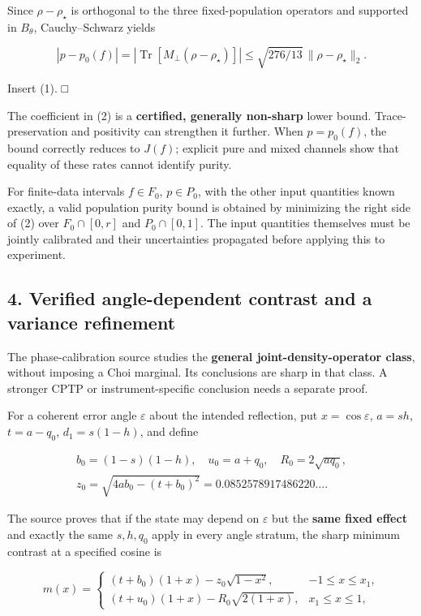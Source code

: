 \documentclass[
  10pt,
  a4paper,
]{article}
\begin{document}
Since \(\rho-\rho_\star\) is orthogonal to the three fixed-population operators and supported in \(B_\theta\), Cauchy--Schwarz yields

\[
 |p-p_0(f)|=|\operatorname{Tr}[M_\perp(\rho-\rho_\star)]|
 \le\sqrt{276/13}\,\|\rho-\rho_\star\|_2.
\]

Insert (1). □

The coefficient in (2) is a \textbf{certified, generally non-sharp} lower bound. Trace-preservation and positivity can strengthen it further. When \(p=p_0(f)\), the bound correctly reduces to \(J(f)\); explicit pure and mixed channels show that equality of these rates cannot identify purity.

For finite-data intervals \(f\in F_0\), \(p\in P_0\), with the other input quantities known exactly, a valid population purity bound is obtained by minimizing the right side of (2) over \(F_0\cap[0,r]\) and \(P_0\cap[0,1]\). The input quantities themselves must be jointly calibrated and their uncertainties propagated before applying this to experiment.

\subsection{4. Verified angle-dependent contrast and a variance refinement}\label{verified-angle-dependent-contrast-and-a-variance-refinement}

The phase-calibration source studies the \textbf{general joint-density-operator class}, without imposing a Choi marginal. Its conclusions are sharp in that class. A stronger CPTP or instrument-specific conclusion needs a separate proof.

For a coherent error angle \(\varepsilon\) about the intended reflection, put \(x=\cos\varepsilon\), \(a=sh\), \(t=a-q_0\), \(d_1=s(1-h)\), and define

\[
\begin{gathered}
 b_0=(1-s)(1-h),\quad u_0=a+q_0,\quad R_0=2\sqrt{aq_0},\\
 z_0=\sqrt{4ab_0-(t+b_0)^2}=0.0852578917486220\ldots.
\end{gathered}
\]

The source proves that if the state may depend on \(\varepsilon\) but the \textbf{same fixed effect} and exactly the same \(s,h,q_0\) apply in every angle stratum, the sharp minimum contrast at a specified cosine is

\[
 m(x)=\begin{cases}
 (t+b_0)(1+x)-z_0\sqrt{1-x^2},&-1\le x\le x_1,\\
 (t+u_0)(1+x)-R_0\sqrt{2(1+x)},&x_1\le x\le1,
 \end{cases}\tag{3}
\]
\end{document}
